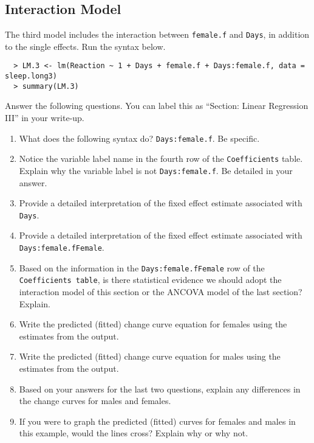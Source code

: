 \documentclass[]{article}
\begin{document}
%
%

\subsection*{Interaction Model}

\noindent The third model includes the interaction between \texttt{female.f} and \texttt{Days}, in addition to the single effects. Run the syntax below.

\begin{verbatim}
  > LM.3 <- lm(Reaction ~ 1 + Days + female.f + Days:female.f, data = sleep.long3)
  > summary(LM.3)
\end{verbatim}

\noindent Answer the following questions. You can label this as ``Section: Linear Regression III'' in your write-up.

\begin{enumerate}[resume]
\item What does the following syntax do? \texttt{Days:female.f}. Be specific.
\item Notice the variable label name in the fourth row of the \texttt{Coefficients} table. Explain why the variable label is not \texttt{Days:female.f}. Be detailed in your answer.
\item Provide a detailed interpretation of the fixed effect estimate associated with \texttt{Days}.
\item Provide a detailed interpretation of the fixed effect estimate associated with \texttt{Days:female.fFemale}.
\item Based on the information in the \texttt{Days:female.fFemale} row of the \texttt{Coefficients table}, is there statistical evidence we should adopt the interaction model of this section or  the ANCOVA model of the last section? Explain.
\item Write the predicted (fitted) change curve equation for females using the estimates from the output.
\item Write the predicted (fitted) change curve equation for males using the estimates from the output.
\item Based on your answers for the last two questions, explain any differences in the change curves for males and females.
\item If you were to graph the predicted (fitted) curves for females and males in this example, would the lines cross? Explain why or why not.
\end{enumerate}
\end{document}
